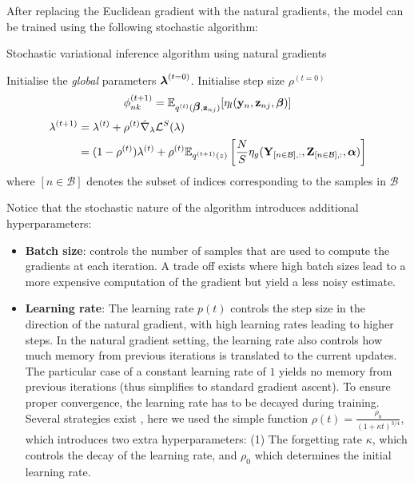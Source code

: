 After replacing the Euclidean gradient with the natural gradients, the model can be trained using the following stochastic algorithm: 

\begin{algorithm}[H]
  \caption{Stochastic variational inference algorithm using natural gradients}
  \begin{algorithmic}[1]
	\State Initialise the \textit{global} parameters $\mbox{\boldmath $\lambda$}^{(t=0)}$.
	\State Initialise step size $\rho^{(t=0)}$
	\Repeat
	    \State {}
			\State $$ \phi_{nk}^{(t+1)} = \mathbb{E}_{q^{(t)}(\mbox{\boldmath $\beta$},{\bf z}_{nj})}[\eta_l({\bf y}_{n},{\bf z}_{nj},\mbox{\boldmath $\beta$})] $$
      	\EndFor
		     \State
        		\begin{align} \label{eq_elbo_factorised} \begin{split}
            	\lambda^{(t + 1)} &=  \lambda^{(t)} +  \rho ^{(t)} \hat{\nabla}_{\lambda} \mathcal{L}^S(\lambda) \\
            	 &=  (1-\rho ^{(t)})\lambda^{(t)} +  \rho ^{(t)} \mathbb{E}_{q^{(t+1)}(z)}\left[\frac{N}{S}\eta_g({\bf Y}_{[n \in \mathcal{B}],:},{\bf Z}_{[n \in \mathcal{B}],:},\mbox{\boldmath $\alpha$})\right]
            \end{split} \end{align}
            \State where $[n \in \mathcal{B}]$ denotes the subset of indices corresponding to the samples in $\mathcal{B}$
      	\EndFor
	\end{algorithmic}
\end{algorithm}


Notice that the stochastic nature of the algorithm introduces additional hyperparameters:

\begin{itemize}
    \item \textbf{Batch size}: controls the number of samples that are used to compute the gradients at each iteration. A trade off exists where high batch sizes lead to a more expensive computation of the gradient but yield a less noisy estimate.

    \item \textbf{Learning rate}: The learning rate $p(t)$ controls the step size in the direction of the natural gradient, with high learning rates leading to higher steps. In the natural gradient setting, the learning rate also controls how much memory from previous iterations is translated to the current updates. The particular case of a constant learning rate of $1$ yields no memory from previous iterations (thus simplifies to standard gradient ascent). To ensure proper convergence, the learning rate has to be decayed during training. Several strategies exist \cite{Ranganath2013}, here we used the simple function $\rho(t) = \frac{\rho_0}{(1 + \kappa t)^{3/4}}$, which introduces two extra hyperparameters: (1) The forgetting rate $\kappa$, which controls the decay of the learning rate, and $\rho_0$ which determines the initial learning rate.

\end{itemize}